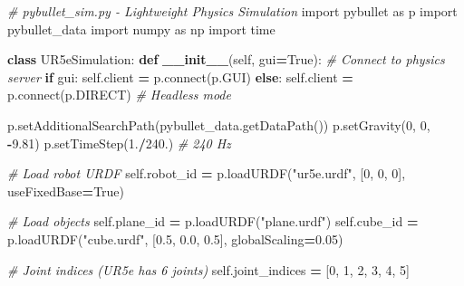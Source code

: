 \documentclass[
]{article}
\newenvironment{Shaded}{\begin{snugshade}}{\end{snugshade}}
\newcommand{\CommentTok}[1]{\textcolor[rgb]{0.56,0.35,0.01}{\textit{#1}}}
\newcommand{\ControlFlowTok}[1]{\textcolor[rgb]{0.13,0.29,0.53}{\textbf{#1}}}
\newcommand{\DecValTok}[1]{\textcolor[rgb]{0.00,0.00,0.81}{#1}}
\newcommand{\ExtensionTok}[1]{#1}
\newcommand{\FloatTok}[1]{\textcolor[rgb]{0.00,0.00,0.81}{#1}}
\newcommand{\FunctionTok}[1]{\textcolor[rgb]{0.13,0.29,0.53}{\textbf{#1}}}
\newcommand{\ImportTok}[1]{#1}
\newcommand{\KeywordTok}[1]{\textcolor[rgb]{0.13,0.29,0.53}{\textbf{#1}}}
\newcommand{\NormalTok}[1]{#1}
\newcommand{\OperatorTok}[1]{\textcolor[rgb]{0.81,0.36,0.00}{\textbf{#1}}}
\newcommand{\StringTok}[1]{\textcolor[rgb]{0.31,0.60,0.02}{#1}}
\newcommand{\VariableTok}[1]{\textcolor[rgb]{0.00,0.00,0.00}{#1}}
\begin{document}
\begin{Shaded}
\begin{Highlighting}[]
\CommentTok{\# pybullet\_sim.py {-} Lightweight Physics Simulation}
\ImportTok{import}\NormalTok{ pybullet }\ImportTok{as}\NormalTok{ p}
\ImportTok{import}\NormalTok{ pybullet\_data}
\ImportTok{import}\NormalTok{ numpy }\ImportTok{as}\NormalTok{ np}
\ImportTok{import}\NormalTok{ time}

\KeywordTok{class}\NormalTok{ UR5eSimulation:}
    \KeywordTok{def} \FunctionTok{\_\_init\_\_}\NormalTok{(}\VariableTok{self}\NormalTok{, gui}\OperatorTok{=}\VariableTok{True}\NormalTok{):}
        \CommentTok{\# Connect to physics server}
        \ControlFlowTok{if}\NormalTok{ gui:}
            \VariableTok{self}\NormalTok{.client }\OperatorTok{=}\NormalTok{ p.}\ExtensionTok{connect}\NormalTok{(p.GUI)}
        \ControlFlowTok{else}\NormalTok{:}
            \VariableTok{self}\NormalTok{.client }\OperatorTok{=}\NormalTok{ p.}\ExtensionTok{connect}\NormalTok{(p.DIRECT)  }\CommentTok{\# Headless mode}

\NormalTok{        p.setAdditionalSearchPath(pybullet\_data.getDataPath())}
\NormalTok{        p.setGravity(}\DecValTok{0}\NormalTok{, }\DecValTok{0}\NormalTok{, }\OperatorTok{{-}}\FloatTok{9.81}\NormalTok{)}
\NormalTok{        p.setTimeStep(}\FloatTok{1.}\OperatorTok{/}\FloatTok{240.}\NormalTok{)  }\CommentTok{\# 240 Hz}

        \CommentTok{\# Load robot URDF}
        \VariableTok{self}\NormalTok{.robot\_id }\OperatorTok{=}\NormalTok{ p.loadURDF(}\StringTok{"ur5e.urdf"}\NormalTok{, [}\DecValTok{0}\NormalTok{, }\DecValTok{0}\NormalTok{, }\DecValTok{0}\NormalTok{], useFixedBase}\OperatorTok{=}\VariableTok{True}\NormalTok{)}

        \CommentTok{\# Load objects}
        \VariableTok{self}\NormalTok{.plane\_id }\OperatorTok{=}\NormalTok{ p.loadURDF(}\StringTok{"plane.urdf"}\NormalTok{)}
        \VariableTok{self}\NormalTok{.cube\_id }\OperatorTok{=}\NormalTok{ p.loadURDF(}\StringTok{"cube.urdf"}\NormalTok{, [}\FloatTok{0.5}\NormalTok{, }\FloatTok{0.0}\NormalTok{, }\FloatTok{0.5}\NormalTok{], globalScaling}\OperatorTok{=}\FloatTok{0.05}\NormalTok{)}

        \CommentTok{\# Joint indices (UR5e has 6 joints)}
        \VariableTok{self}\NormalTok{.joint\_indices }\OperatorTok{=}\NormalTok{ [}\DecValTok{0}\NormalTok{, }\DecValTok{1}\NormalTok{, }\DecValTok{2}\NormalTok{, }\DecValTok{3}\NormalTok{, }\DecValTok{4}\NormalTok{, }\DecValTok{5}\NormalTok{]}


\end{Highlighting}
\end{Shaded}
\end{document}
